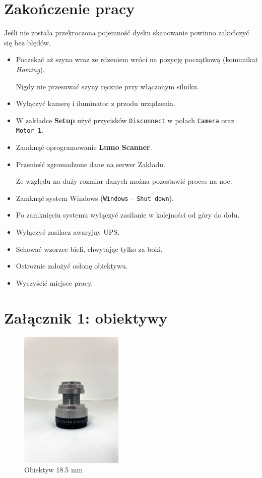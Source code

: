 \documentclass[
  letterpaper,
  DIV=11,
  numbers=noendperiod]{scrreprt}
\begin{document}
\hypertarget{zakoux144czenie-pracy}{%
\section{Zakończenie pracy}\label{zakoux144czenie-pracy}}

Jeśli nie została przekroczona pojemność dysku skanowanie powinno
zakończyć się bez błędów.

\begin{itemize}
\item
  Poczekać aż szyna wraz ze rdzeniem wróci na pozycję początkową
  (komunikat \emph{Homing}).

  Nigdy nie przesuwać szyny ręcznie przy włączonym silniku.
\item
  Wyłączyć kamerę i iluminator z przodu urządzenia.
\item
  W zakładce \textbf{Setup} użyć przycisków \texttt{Disconnect} w polach
  \texttt{Camera} oraz \texttt{Motor\ 1}.
\item
  Zamknąć oprogramowanie \textbf{Lumo Scanner}.
\item
  Przenieść zgromadzone dane na serwer Zakładu.

  Ze względu na duży rozmiar danych można pozostawić proces na noc.
\item
  Zamknąć system Windows (\texttt{Windows} -- \texttt{Shut\ down}).
\item
  Po zamknięciu systemu wyłączyć zasilanie w kolejności od góry do dołu.
\item
  Wyłączyć zasilacz awaryjny UPS.
\item
  Schować wzorzec bieli, chwytając tylko za boki.
\item
  Ostrożnie założyć osłonę obiektywu.
\item
  Wyczyścić miejsce pracy.
\end{itemize}

\newpage{}

\hypertarget{zaux142ux105cznik-1-obiektywy}{%
\section{Załącznik 1: obiektywy}\label{zaux142ux105cznik-1-obiektywy}}

\begin{figure}

{\centering \includegraphics[width=1.94792in,height=\textheight]{images/specim-18.5.png}

}

\caption{Obiektyw 18.5 mm}

\end{figure}
\end{document}
